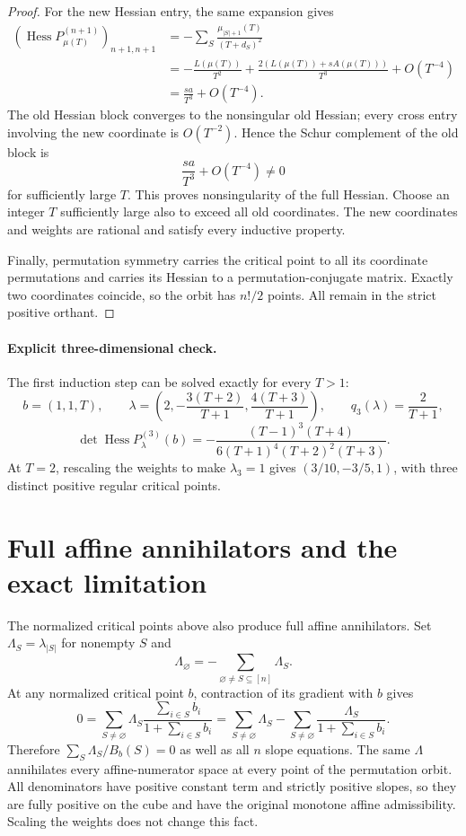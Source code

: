 \documentclass[11pt]{article}
\begin{document}
\begin{proof}
For the new Hessian entry, the same expansion gives
\[
 \begin{aligned}
 (\operatorname{Hess}P^{(n+1)}_{\mu(T)})_{n+1,n+1}
 &=-\sum_S\frac{\mu_{|S|+1}(T)}{(T+d_S)^2}\\
 &=-\frac{L(\mu(T))}{T^2}
    +\frac{2(L(\mu(T))+sA(\mu(T)))}{T^3}+O(T^{-4})\\
 &=\frac{sa}{T^3}+O(T^{-4}).
 \end{aligned}
\]
The old Hessian block converges to the nonsingular old Hessian; every
cross entry involving the new coordinate is $O(T^{-2})$. Hence the Schur
complement of the old block is
\[
 \frac{sa}{T^3}+O(T^{-4})\ne0
\]
for sufficiently large $T$. This proves nonsingularity of the full Hessian.
Choose an integer $T$ sufficiently large also to exceed all old coordinates.
The new coordinates and weights are rational and satisfy every inductive
property.

Finally, permutation symmetry carries the critical point to all its
coordinate permutations and carries its Hessian to a permutation-conjugate
matrix. Exactly two coordinates coincide, so the orbit has $n!/2$ points.
All remain in the strict positive orthant.
\end{proof}

\paragraph{Explicit three-dimensional check.}
The first induction step can be solved exactly for every $T>1$:
\[
 b=(1,1,T),\qquad
 \lambda=\left(2,-\frac{3(T+2)}{T+1},
                    \frac{4(T+3)}{T+1}\right),
 \qquad q_3(\lambda)=\frac{2}{T+1},
\]
\[
 \det\operatorname{Hess}P^{(3)}_\lambda(b)
 =-\frac{(T-1)^3(T+4)}{6(T+1)^4(T+2)^2(T+3)}.
\]
At $T=2$, rescaling the weights to make $\lambda_3=1$ gives
$(3/10,-3/5,1)$, with three distinct positive regular critical points.

\section{Full affine annihilators and the exact limitation}

The normalized critical points above also produce full affine annihilators.
Set $\Lambda_S=\lambda_{|S|}$ for nonempty $S$ and
\[
 \Lambda_\varnothing=-\sum_{\varnothing\ne S\subseteq[n]}\Lambda_S.
\]
At any normalized critical point $b$, contraction of its gradient with $b$
gives
\[
 0=\sum_{S\ne\varnothing}\Lambda_S
       \frac{\sum_{i\in S}b_i}{1+\sum_{i\in S}b_i}
  =\sum_{S\ne\varnothing}\Lambda_S
    -\sum_{S\ne\varnothing}\frac{\Lambda_S}{1+\sum_{i\in S}b_i}.
\]
Therefore $\sum_S\Lambda_S/B_b(S)=0$ as well as all $n$ slope equations.
The same $\Lambda$ annihilates every affine-numerator space at every point
of the permutation orbit. All denominators have positive constant term
and strictly positive slopes, so they are fully positive on the cube and
have the original monotone affine admissibility. Scaling the weights does
not change this fact.
\end{document}
